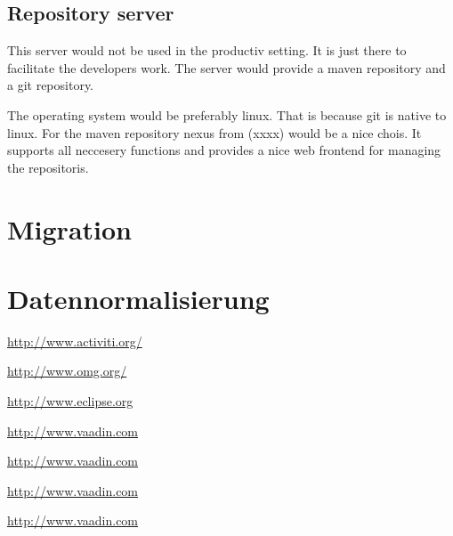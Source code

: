 \documentclass[paper=a4,twoside=false,BCOR=0mm,DIV=calc,fontsize=12pt]{scrartcl}
\begin{document}
\subsection{Repository server}
This server would not be used in the productiv setting. It is just there to facilitate the developers work.
The server would provide a maven repository and a git repository. 

The operating system would be preferably linux. That is because git is native to linux.
For the maven repository nexus from (xxxx) would be a nice chois. It supports all neccesery functions and provides a nice web frontend for managing the repositoris.







\section{Migration}


\section{Datennormalisierung}





\begin{thebibliography}{99}

 \url{http://www.activiti.org/}

 \url{http://www.omg.org/}

 \url{http://www.eclipse.org} %

 \url{http://www.vaadin.com}

 \url{http://www.vaadin.com}

 \url{http://www.vaadin.com}

 \url{http://www.vaadin.com}

 \url{} %


 \url{}

 \url{}

 \url{}

 \url{}

 \url{}

 \url{}

 \url{}



\end{thebibliography}
\end{document}
